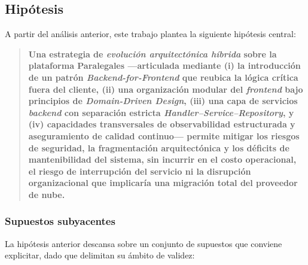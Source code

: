 \subsection{Hipótesis}

A partir del análisis anterior, este trabajo plantea la siguiente hipótesis central:

\begin{quote}
  \textbf{Una estrategia de \textit{evolución arquitectónica híbrida} sobre la plataforma Paralegales —articulada mediante (i) la introducción de un patrón \textit{Backend-for-Frontend} que reubica la lógica crítica fuera del cliente, (ii) una organización modular del \textit{frontend} bajo principios de \textit{Domain-Driven Design}, (iii) una capa de servicios \textit{backend} con separación estricta \textit{Handler--Service--Repository}, y (iv) capacidades transversales de observabilidad estructurada y aseguramiento de calidad continuo— permite mitigar los riesgos de seguridad, la fragmentación arquitectónica y los déficits de mantenibilidad del sistema, sin incurrir en el costo operacional, el riesgo de interrupción del servicio ni la disrupción organizacional que implicaría una migración total del proveedor de nube.}
\end{quote}

\subsubsection*{Supuestos subyacentes}

La hipótesis anterior descansa sobre un conjunto de supuestos que conviene explicitar, dado que delimitan su ámbito de validez:

